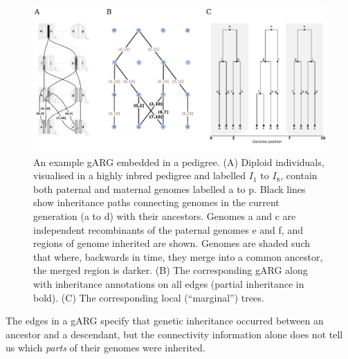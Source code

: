 \documentclass{article}
\begin{document}
\begin{figure}
\begin{center}
    \includegraphics[width=\textwidth]{illustrations/arg-in-pedigree}
\end{center}
\caption{\label{fig-arg-in-pedigree}
An example gARG embedded in a pedigree.
(A) Diploid individuals, visualised in a highly inbred pedigree and
labelled $I_1$ to $I_8$, contain both paternal  and maternal  genomes
labelled \textsf{a} to \textsf{p}. Black lines show inheritance paths connecting
genomes in the current generation (\textsf{a} to \textsf{d}) with their ancestors.
Genomes \textsf{a} and \textsf{c} are independent recombinants of
the paternal genomes \textsf{e}
and \textsf{f}, and regions of genome inherited are shown.
Genomes are shaded such that where, backwards in time,
they merge into a common ancestor, the merged region is darker.
(B) The corresponding gARG along with inheritance annotations on all edges
(partial inheritance in bold).
(C) The corresponding local (``marginal'') trees.
}
\end{figure}

The edges in a gARG specify that genetic inheritance occurred between an
ancestor and a descendant, but the connectivity information alone
does not tell us which \emph{parts} of their genomes were inherited.
\end{document}
